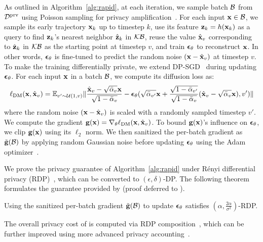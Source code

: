 As outlined in Algorithm~\ref{alg:rapid}, at each iteration, we sample batch ${\mathcal{B}}$ from ${\mathcal{D}}^\mathrm{prv}$ using Poisson sampling for privacy amplification~\citep{renyi-gm}. For each input ${\mathbf{x}} \in {\mathcal{B}}$, we  sample its early trajectory ${\mathbf{x}}_k$ up to timestep $k$,  use its feature ${\mathbf{z}}_k = h({\mathbf{x}}_k)$ as a query to find ${\mathbf{z}}_k$'s nearest neighbor $\hat{{\mathbf{z}}}_k$ in ${\mathcal{K}}{\mathcal{B}}$, 
reuse the value $\hat{{\mathbf{x}}}_v$ corresponding to $\hat{{\mathbf{z}}}_k$ in ${\mathcal{K}}{\mathcal{B}}$ as the starting point at timestep $v$, and  train $\bm{\epsilon}_\theta$ to reconstruct ${\mathbf{x}}$. In other words, $\bm{\epsilon}_\theta$ is fine-tuned to predict the random noise $({\mathbf{x}} - \hat{{\mathbf{x}}}_v)$ at timestep $v$. 
To make the training differentially private, we extend DP-SGD~\citep{abadi2016deep} during updating $\bm{\epsilon}_\theta$. For each input ${\mathbf{x}}$ in a batch ${\mathcal{B}}$, we compute its diffusion loss as: 
\begin{equation}
\label{eq:diffloss}
\ell_\mathrm{DM}({\mathbf{x}}, \hat{{\mathbf{x}}}_v) = {\mathbb{E}}_{v' \sim {\mathcal{U}}(1, v) } \| \frac{\hat{{\mathbf{x}}}_v -\sqrt{\bar{\alpha}_v}{\mathbf{x}}}{\sqrt{1-\bar{\alpha}_v}} - \bm{\epsilon}_\theta( 
\sqrt{\bar{\alpha}_{v'}}{\mathbf{x}} + \frac{\sqrt{1-\bar{\alpha}_{v'}}}{\sqrt{1-\bar{\alpha}_{v}}} (\hat{{\mathbf{x}}}_v -\sqrt{\bar{\alpha}_v}{\mathbf{x}})
, v')  \|
\end{equation}
where the random noise $({\mathbf{x}} - \hat{{\mathbf{x}}}_v)$ is scaled with a randomly sampled timestep $v'$. We compute the  gradient ${\mathbf{g}}({\mathbf{x}}) = \nabla_\theta \ell_\mathrm{DM}({\mathbf{x}}, \hat{{\mathbf{x}}}_v)$. To bound ${\mathbf{g}}({\mathbf{x}})$'s influence on $\bm{\epsilon}_\theta$, we clip 
${\mathbf{g}}({\mathbf{x}})$ using its $\ell_2$ norm. We then sanitized the per-batch gradient as $\tilde{{\mathbf{g}}}({\mathcal{B}})$ by applying random Gaussian noise before updating $\bm{\epsilon}_\theta$ using the Adam optimizer~\citep{adam}. 

We prove the privacy guarantee of Algorithm~\ref{alg:rapid} under R\'{e}nyi differential privacy (RDP)~\citep{renyi}, which can be converted to $(\epsilon, \delta)$-DP. The following theorem formulates the guarantee provided by \system (proof deferred to ).  
\begin{theorem}
\label{the:main}
Using the sanitized per-batch gradient 
$\tilde{{\mathbf{g}}}({\mathcal{B}})$ to update $\bm{\epsilon}_\theta$ satisfies $(\alpha, \frac{2\alpha}{ \sigma^2})$-RDP.
\end{theorem}
The overall privacy cost of \system is computed via RDP composition~\citep{renyi}, which can be further improved using more advanced privacy accounting~\citep{privacy-accounting}.


    
